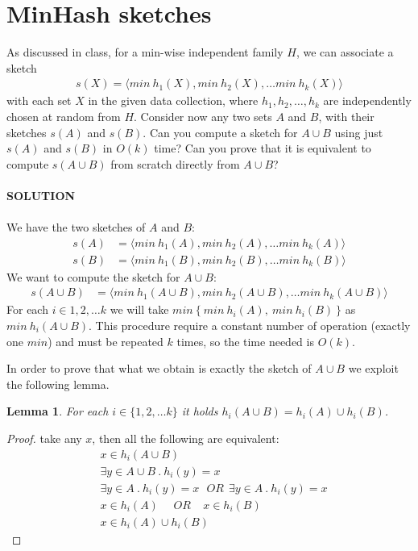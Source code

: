 \documentclass[a4paper]{article}
\newtheorem{lemma}[theorem]{Lemma}
\begin{document}
\section*{MinHash sketches}
As  discussed  in  class,  for  a  min-wise  independent  family $H$, we can associate a sketch
\begin{align*}
s(X) = \langle min\ h_1(X), min\ h_2(X), \dots min\ h_k(X) \rangle
\end{align*}
with each set $X$ in the given data collection, where $h_1, h_2 , \dots, h_k$ are independently chosen at random from $H$. 
Consider now any two sets $A$ and $B$, with their sketches $s(A)$ and $s(B)$. 
Can you compute a sketch for $A \cup B$ using just $s(A)$ and $s(B)$ in $O(k)$ time?
Can you prove that it is equivalent to compute $s(A \cup B)$ from scratch directly from $A \cup B$?
\\
\\
\textbf{SOLUTION}
\\
\\
We have the two sketches of $A$ and $B$:
\begin{align*}
s(A) &= \langle min\ h_1(A), min\ h_2(A), \dots min\ h_k(A) \rangle \\
s(B) &= \langle min\ h_1(B), min\ h_2(B), \dots min\ h_k(B) \rangle
\end{align*}
We want to compute the sketch for $A \cup B$:
\begin{align*}
s(A \cup B) &= \langle min\ h_1(A \cup B), min\ h_2(A \cup B), \dots min\ h_k(A \cup B) \rangle
\end{align*}
For each $i \in {1, 2, \dots k}$ we will take $min\ \{\ min\ h_i(A),\ min\ h_i(B)\ \}$ as $min\ h_i(A \cup B)$.
This procedure require a constant number of operation (exactly one $min$) and must be repeated $k$ times, so the time needed is $O(k)$.

In order to prove that what we obtain is exactly the sketch of $A \cup B$ we exploit the following lemma.
\begin{lemma}
For each $i \in \{ 1, 2, \dots k\}$ it holds $h_i(A \cup B) = h_i(A) \cup h_i(B)$.
\end{lemma}
\begin{proof}
take any $x$, then all the following are equivalent:
\begin{align*}
& x \in h_i(A \cup B) \\
& \exists y \in A \cup B\ .\ h_i(y) = x \\
& \exists y \in A\ .\ h_i(y) = x \ \ \ OR \ \ \exists y \in A\ .\ h_i(y) = x \\
& x \in h_i(A) \ \ \ \ \ \ OR \ \ \ \ \ x \in h_i(B) \\
& x \in h_i(A) \cup h_i(B)
\end{align*}
\end{proof}
\end{document}
